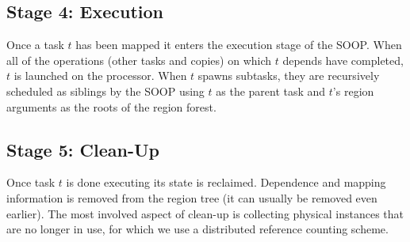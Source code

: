 \subsection{Stage 4: Execution}
\label{sec:exec}

Once a task $t$ has been mapped it enters the execution stage of the SOOP.  When all of
the operations (other tasks and copies) on which $t$ depends have completed, $t$ is
launched on the processor.  When $t$ spawns subtasks, they are recursively scheduled as siblings by
the SOOP using $t$ as the parent task and $t$'s region arguments as the roots of the region forest.


\subsection{Stage 5: Clean-Up}
\label{sec:clean}

Once task $t$ is done executing its state is reclaimed. Dependence
and mapping information is removed from the region tree (it can
usually be removed even earlier).  The most involved aspect of
clean-up is collecting physical instances that are no longer in use,
for which we use a distributed reference counting scheme.


